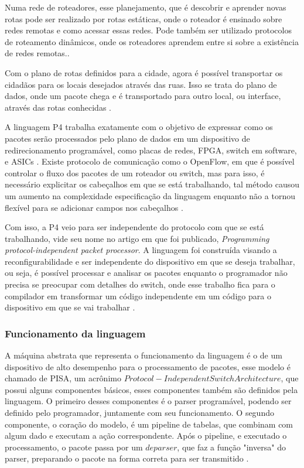 \documentclass[
    12pt,
    openright, 
    oneside,
    a4paper,
    french,
    english,
    brazil
    ]{facom-ufu-abntex2}
\theoremstyle{definition}
\begin{document}
Numa rede de roteadores, esse planejamento, que é descobrir e aprender novas rotas 
pode ser realizado por rotas estáticas, onde o roteador é ensinado sobre redes remotas
e como acessar essas redes. Pode também ser utilizado protocolos de roteamento dinâmicos,
onde os roteadores aprendem entre si sobre a existência de redes remotas.\cite{dataVsControl}.

Com o plano de rotas definidos para a cidade, agora é possível transportar os cidadãos
para os locais desejados através das ruas. Isso se trata do plano de dados, onde 
um pacote chega e é transportado para outro local, ou interface, através das rotas 
conhecidas \cite{dataVsControl}.

A linguagem P4 trabalha exatamente com o objetivo de expressar como os pacotes serão 
processados pelo plano de dados em um dispositivo de redirecionamento programável, 
como placas de redes, FPGA, switch em software, e ASICs \cite{paxos16spec}. Existe 
protocolo de comunicação como o OpenFlow, em que é possível controlar o fluxo dos 
pacotes de um roteador ou switch, mas para isso, é necessário explicitar os 
cabeçalhos em que se está trabalhando, tal método causou um aumento na complexidade 
especificação da linguagem enquanto não a tornou flexível para se adicionar campos 
nos cabeçalhos \cite{bosshart2014p4}.

Com isso, a P4 veio para ser independente do protocolo com que se está trabalhando,
vide seu nome no artigo em que foi publicado, 
\textit{Programming protocol-independent packet processor}. A linguagem foi 
construída visando a reconfigurabilidade e ser independente do dispositivo em que se 
deseja trabalhar, ou seja, é possível processar e analisar os pacotes enquanto o programador
não precisa se preocupar com detalhes do switch, onde esse trabalho fica para o compilador 
em transformar um código independente em um código para o dispositivo em que se vai 
trabalhar \cite{bosshart2014p4}.

\subsubsection{Funcionamento da linguagem}

A máquina abstrata que representa o funcionamento da linguagem é o de um dispositivo
de alto desempenho para o processamento de pacotes, esse modelo é chamado de PISA,
um acrônimo $Protocol-Independent Switch Architecture$, que possui alguns componentes
básicos, esses componentes também são definidos pela linguagem. O primeiro desses 
componentes é o parser programável, podendo ser definido pelo programador, juntamente 
com seu funcionamento. O segundo componente, o coração do modelo, é um pipeline de tabelas,
que combinam com algum dado e executam a ação correspondente. Após o pipeline, e executado
o processamento, o pacote passa por um $deparser$, que faz a função "inversa" do parser,
preparando o pacote na forma correta para ser transmitido \cite{p4LangTutorial}.
\end{document}
